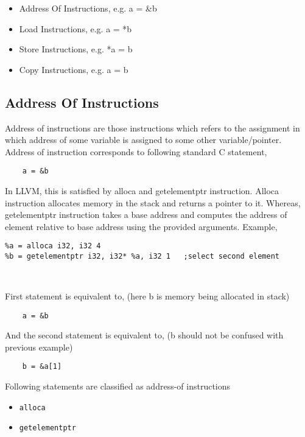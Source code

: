 \documentclass[a4paper,11pt]{report}
\begin{document}
\begin{itemize}
    \item Address Of Instructions, e.g. a = \&b
    \item Load Instructions, e.g.  a = *b
    \item Store Instructions, e.g. *a = b
    \item Copy Instructions, e.g. a = b
\end{itemize}

\subsection{Address Of Instructions}
Address of instructions are those instructions which refers to the assignment 
in which address of some variable is assigned to some other variable/pointer.
Address of instruction corresponds to following standard C statement,
    
\begin{lstlisting}
    a = &b
\end{lstlisting}

In LLVM, this is satisfied by alloca and getelementptr instruction.
Alloca instruction allocates memory in the stack and returns a pointer to it.
Whereas, getelementptr instruction takes a base address and computes the address
of element relative to base address using the provided arguments.
Example,

\begin{verbatim}
%a = alloca i32, i32 4
%b = getelementptr i32, i32* %a, i32 1   ;select second element                 
 
                       
\end{verbatim}

\noindent
First statement is equivalent to, (here b is memory being allocated in stack)

\begin{lstlisting}
    a = &b
\end{lstlisting}

\noindent
And the second statement is equivalent to, (b should not be confused with 
previous example)
\begin{lstlisting}
    b = &a[1]
\end{lstlisting}

\noindent
Following statements are classified as address-of instructions
\begin{itemize}
    \item \texttt{alloca}
    \item \texttt{getelementptr}
\end{itemize}
\end{document}
